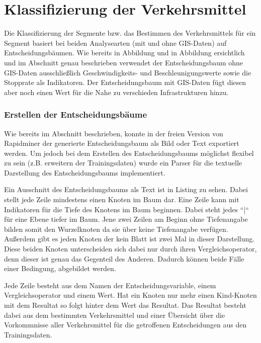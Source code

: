 \section{Klassifizierung der Verkehrsmittel}
Die Klassifizierung der Segmente bzw. das Bestimmen des Verkehrsmittels für ein Segment basiert bei beiden Analysearten (mit und ohne GIS-Daten) auf Entscheidungsbäumen. Wie bereits in Abbildung  und in Abbildung  ersichtlich und im Abschnitt  genau beschrieben verwendet der Entscheidungsbaum ohne GIS-Daten ausschließlich Geschwindigkeits- und Beschleunigungswerte sowie die Stopprate als Indikatoren. Der Entscheidungsbaum mit GIS-Daten fügt diesen aber noch einen Wert für die Nahe zu verschieden Infrastrukturen hinzu.

\subsubsection{Erstellen der Entscheidungsbäume}
\label{entscheidungsbaumGenerierungPHP}
Wie bereits im Abschnitt  beschrieben, konnte in der freien Version von Rapidminer der generierte Entscheidungsbaum als Bild oder Text exportiert werden. Um jedoch bei dem Erstellen des Entscheidungsbaums möglichst flexibel zu sein (z.B. erweitern der Trainingsdaten) wurde ein Parser für die textuelle Darstellung des Entscheidungsbaums implementiert. 

Ein Ausschnitt des Entscheidungsbaums als Text ist in Listing  zu sehen. Dabei stellt jede Zeile mindestens einen Knoten im Baum dar. Eine Zeile kann mit Indikatoren für die Tiefe des Knotens im Baum beginnen. Dabei steht jedes ``|`` für eine Ebene tiefer im Baum. Jene zwei Zeilen am Beginn ohne Tiefenangabe bilden somit den Wurzelknoten da sie über keine Tiefenangabe verfügen. Außerdem gibt es jeden Knoten der kein Blatt ist zwei Mal in dieser Darstellung. Diese beiden Knoten unterscheiden sich dabei nur durch ihren Vergleichsoperator, denn dieser ist genau das Gegenteil des Anderen. Dadurch können beide Fälle einer Bedingung, abgebildet werden.

Jede Zeile besteht aus dem Namen der Entscheidungsvariable, einem Vergleichsoperator und einem Wert. Hat ein Knoten nur mehr einen Kind-Knoten mit dem Resultat so folgt hinter dem Wert das Resultat. Das Resultat besteht dabei aus dem bestimmten Verkehrsmittel und einer Übersicht über die Vorkommnisse aller Verkehrsmittel für die getroffenen Entscheidungen aus den Trainingsdaten.

